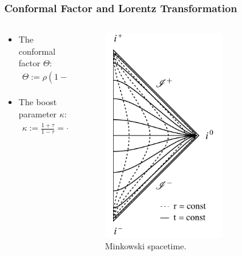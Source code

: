 \documentclass{beamer}
\theoremstyle{remark}
\theoremstyle{plain}
\theoremstyle{plain}
\begin{document}
\begin{frame}
  \frametitle{Conformal Factor and Lorentz Transformation}
  \begin{columns}
    \begin{column}{0.5\textwidth}
      \begin{itemize}
        \item The conformal factor $\Theta$:
        \begin{align}
          \Theta := \rho (1-\tau^2) = \frac{1}{\tilde{\rho}}. \nonumber
        \end{align}
        \vspace{5mm}
        \item The boost parameter $\kappa$:
        \begin{align}
          \kappa := \frac{1+\tau}{1-\tau} = -\frac{\tilde{v}}{\tilde{u}}. \nonumber
        \end{align}
      \end{itemize}
    \end{column}
    \begin{column}{0.5\textwidth}
      \vspace*{-.8em} %
      \hfill
      \begin{figure}[h]
        \includegraphics[width=0.65\textwidth]{Penrose diagram.pdf} %
        \caption{Minkowski spacetime.}
      \end{figure}
    \end{column}
  \end{columns}
\end{frame}
\end{document}
